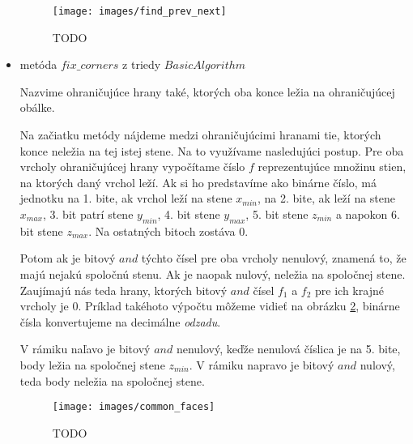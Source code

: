 \begin{itemize}
{                \begin{figure}
                    \centerline{\texttt{[image: images/find\_prev\_next]}}
                    \caption[TODO]{TODO}
                    \label{obr:find_prev_next}
                \end{figure}
    }
    \item{
        metóda $fix\_corners$ z triedy $BasicAlgorithm$

        Nazvime ohraničujúce hrany také, ktorých oba konce ležia na ohraničujúcej obálke.
                
                Na začiatku metódy nájdeme medzi ohraničujúcimi hranami tie, ktorých konce neležia
                na tej istej stene. Na to využívame nasledujúci postup. Pre oba vrcholy ohraničujúcej 
                hrany vypočítame číslo $f$ reprezentujúce množinu stien, na ktorých daný vrchol leží. 
                Ak si ho predstavíme ako binárne číslo, má jednotku na 1. bite, ak vrchol leží na stene 
                $x_{min}$, na 2. bite, ak leží na stene $x_{max}$, 3. bit patrí stene $y_{min}$, 4. bit
                stene $y_{max}$, 5. bit stene $z_{min}$ a napokon 6. bit stene $z_{max}$. Na ostatných 
                bitoch zostáva 0. 
                
                Potom ak je bitový $and$ týchto čísel pre oba vrcholy nenulový, znamená
                to, že majú nejakú spoločnú stenu. Ak je naopak nulový, neležia na spoločnej stene.
                Zaujímajú nás teda hrany, ktorých bitový $and$ čísel $f_1$ a $f_2$ pre ich krajné 
                vrcholy je 0. Príklad takéhoto výpočtu môžeme vidieť na obrázku \ref{obr:common_faces}, 
                binárne čísla konvertujeme na decimálne \textit{odzadu}.

                V rámiku naľavo je bitový $and$ nenulový, keďže nenulová číslica je na 5. bite, body ležia
                na spoločnej stene $z_{min}$. V rámiku napravo je bitový $and$ nulový, teda body neležia
                na spoločnej stene.

                \begin{figure}
                    \centerline{\texttt{[image: images/common\_faces]}}
                    \caption[TODO]{TODO}
                    \label{obr:common_faces}
                \end{figure}

}
\end{itemize}

